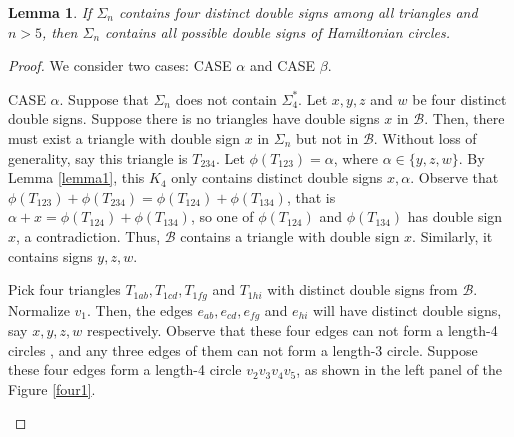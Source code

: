 \documentclass[12pt]{amsart}
\theoremstyle{plain}
\newtheorem{lemma}[theorem]{Lemma}
\theoremstyle{definition}%
\begin{document}
\begin{lemma}\label{lemmac}
If \(\Sigma_n\) contains four distinct  double signs among all triangles and $n>5$, then \(\Sigma_n\) contains all possible double signs of Hamiltonian circles.
\end{lemma}
\begin{proof}

We consider two cases: CASE $\alpha$ and CASE $\beta$.

    CASE $\alpha$. Suppose that \(\Sigma_n\) does not contain $\Sigma_4^*$. Let $x,y,z$ and $w$ be four distinct double signs. Suppose there is no triangles have double signs $x$ in $\mathcal{B}$. Then, there must exist a triangle with double sign $x$ in $\Sigma_n$ but not in  $\mathcal{B}$. Without loss of generality, say this triangle is $T_{234}$. Let $\phi(T_{123})=\alpha$, where $\alpha\in\{y,z,w\}.$ By Lemma \ref{lemma1}, this $K_4$ only contains distinct double signs $x,\alpha$. Observe that $\phi(T_{123})+\phi(T_{234})=\phi(T_{124})+\phi(T_{134})$, that is $\alpha+x=\phi(T_{124})+\phi(T_{134})$, so one of $\phi(T_{124}) $ and $\phi(T_{134})$ has double sign $x$, a contradiction. Thus, $\mathcal{B}$ contains a triangle with double sign $x$. Similarly,
     it contains signs $y,z,w$. 
     
     Pick four triangles $T_{1ab},T_{1cd},T_{1fg}$ and $T_{1hi}$ with distinct double signs from $\mathcal{B}$. Normalize $v_1$. Then,  the edges $e_{ab},e_{cd},e_{fg}$ and $e_{hi}$ will have distinct double signs, say $x,y,z,w$ respectively. 
     Observe that these four edges can not form a length-4 circles , and any three edges of them can not form a length-3 circle. Suppose these four edges form a length-4 circle $v_2v_3v_4v_5$, as shown in the left panel of the Figure \ref{four1}. 
\vspace{-6pt}
\begin{figure}[H]
    \centering 
{}
\end{figure}
\end{proof}
\end{document}
